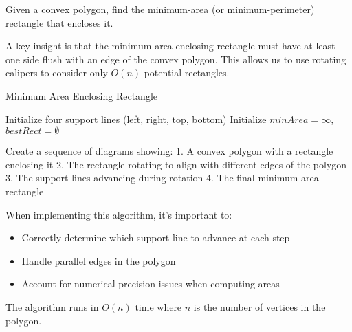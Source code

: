 Given a convex polygon, find the minimum-area (or minimum-perimeter) rectangle that encloses it.

\begin{insight}
A key insight is that the minimum-area enclosing rectangle must have at least one side flush with an edge of the convex polygon. This allows us to use rotating calipers to consider only $O(n)$ potential rectangles.
\end{insight}

\begin{algorithm}[H]
\SetAlgoLined
\caption{Minimum Area Enclosing Rectangle}

Initialize four support lines (left, right, top, bottom)\;
Initialize $minArea = \infty$, $bestRect = \emptyset$\;

\;
\end{algorithm}

\begin{visualexample}
Create a sequence of diagrams showing:
1. A convex polygon with a rectangle enclosing it
2. The rectangle rotating to align with different edges of the polygon
3. The support lines advancing during rotation
4. The final minimum-area rectangle
\end{visualexample}

\begin{implementation}
When implementing this algorithm, it's important to:
\begin{itemize}
    \item Correctly determine which support line to advance at each step
    \item Handle parallel edges in the polygon
    \item Account for numerical precision issues when computing areas
\end{itemize}
\end{implementation}

\begin{complexity}
The algorithm runs in $O(n)$ time where $n$ is the number of vertices in the polygon.
\end{complexity}
